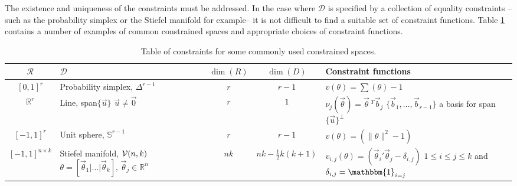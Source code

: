 \documentclass[10pt,fleqn]{article} \pdfoutput=1
\DeclareMathOperator{\1}{\mathbbm{1}} \DeclareMathOperator{\bigO}{\mc O}
\begin{document}
The existence and uniqueness of the constraints must be addressed.  In the
case where $\mathcal{D}$ is specified by a collection of equality
constraints -- such as the probability simplex or the Stiefel manifold for
example--  it is not difficult to find a suitable set of constraint
functions. Table \ref{TABLE:Equality_constraints_examples} contains a
number of examples of common constrained spaces and appropriate choices of
constraint functions.  \renewcommand{\arraystretch}{1.5} \begin{table}[h!]
	\begin{center} \begin{tabular}{| c | m{4 cm} | c | c | m{6cm} |}
			\hline $\mathcal{R}$                           & $\mathcal{D}$                                  & $\dim(R)$ &
			$\dim(D)$                                      & Constraint functions                                                        \\ \hline $[0,1]^r$ &
			Probability simplex, $\Delta^{r-1}$                 & $r$                                            & $r-1$     & $v(\theta)
				= \sum(\theta) -1$                                                                                                           \\ \hline $\mathbb{R}^r$ & Line,
			span$\{\vec{u}\}$ \newline $\vec{u}\ne\vec{0}$ & $r$                                            & $1$
			                                               &
			$\nu_j(\vec{\theta}) = \vec{\theta}\,^T\vec{b}_j$ \newline
			$\{\vec{b}_1,\dots,\vec{b}_{r-1}\}$ a basis for
			span$\{\vec{u}\}^\perp$                                                                                                      \\ \hline $[-1,1]^r$ & Unit
			sphere, $\mathbb{S}^{r-1}$                     & $r$                                            & $r-1$     & $v(\theta) =
				(\|\theta\|^2 -1)$                                                                                                    \\ \hline $[-1,1]^{n\times
			k}$                                            & Stiefel manifold, $\mathcal{V}(n,k)$ \newline
			$\theta = [\vec{\theta}_1 | \dots | \vec{\theta}_k], \,
			\vec{\theta}_j \in \mathbb{R}^n$               & $nk$                                           & $nk -
			\frac{1}{2}k(k+1)$                             & $v_{i,j}(\theta) = (
				\vec{\theta}_i'\vec{\theta}_j- \delta_{i,j})$ \newline
			$1\le i \le j \le k$ and $\delta_{i,j} = \mathbbm{1}_{i=j}$
			\\ \hline\end{tabular} \end{center} \caption{Table of
		constraints for some commonly used constrained spaces.}
	\label{TABLE:Equality_constraints_examples} \end{table}
\end{document}
